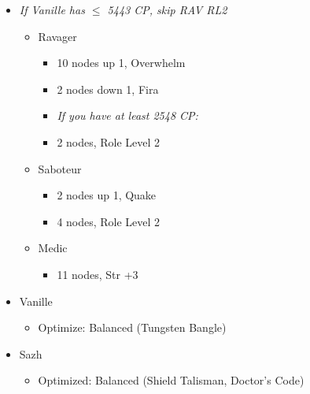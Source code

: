 \begin{multicols}{2}
\begin{menu}
\begin{itemize}
\begin{itemize}
				      \item \textit{If Vanille has $\le$ 5443 CP, skip RAV RL2}
				            \begin{itemize}
					            \item Ravager
					                  \begin{itemize}
						                  \item 10 nodes up 1, Overwhelm
						                  \item 2 nodes down 1, Fira
						                  \item \textit{If you have at least 2548 CP:}
						                  \item 2 nodes, Role Level 2
					                  \end{itemize}
					            \item Saboteur
					                  \begin{itemize}
						                  \item 2 nodes up 1, Quake
						                  \item 4 nodes, Role Level 2
					                  \end{itemize}
					            \item Medic
					                  \begin{itemize}
						                  \item 11 nodes, Str +3
					                  \end{itemize}
				            \end{itemize}
			      \end{itemize}
			      \columnbreak
			      \equip
			      \begin{itemize}
				      \item Vanille
				            \begin{itemize}
					            \item \begin{flushleft}Optimize: Balanced (Tungsten Bangle)\end{flushleft}
				            \end{itemize}
				      \item Sazh
				            \begin{itemize}
					            \item \begin{flushleft}Optimized: Balanced (Shield Talisman, Doctor's Code)\end{flushleft}
				            \end{itemize}
			      \end{itemize}
		\end{itemize}
	\end{menu}
	\renewcommand{\first}{[1] Slash \& Burn (\com/\rav)}
	\renewcommand{\second}{[2] War \& Peace (\com/\med)}
	\renewcommand{\third}{[3] Tide Turner (\syn/\sab)}
	\renewcommand{\fourth}{[4] }
	\renewcommand{\fifth}{[5] Undermine (\rav/\sab)}
	\renewcommand{\sixth}{[6] Divide \& Conquer (\com/\sab)}


\end{multicols}
